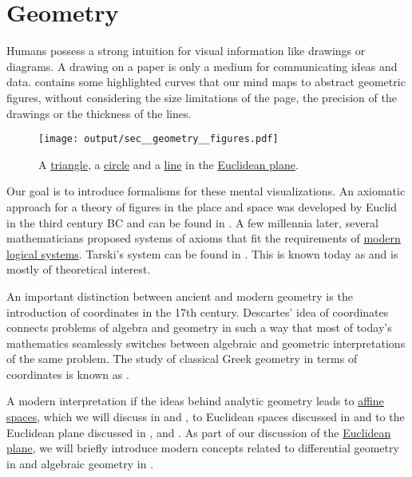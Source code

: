\section{Geometry}\label{sec:geometry}

Humans possess a strong intuition for visual information like drawings or diagrams. A drawing on a paper is only a medium for communicating ideas and data.  contains some highlighted curves that our mind maps to abstract geometric figures, without considering the size limitations of the page, the precision of the drawings or the thickness of the lines.

\begin{figure}[!ht]
  \centering
  \texttt{[image: output/sec\_\_geometry\_\_figures.pdf]}
  \caption{A \hyperref[def:triangle]{triangle}, a \hyperref[def:circle]{circle} and a \hyperref[def:affine_line]{line} in the \hyperref[def:euclidean_space]{Euclidean plane}.}\label{fig:sec:geometry/figures}
\end{figure}

Our goal is to introduce formalisms for these mental visualizations. An axiomatic approach for a theory of figures in the place and space was developed by Euclid in the third century BC and can be found in \cite{Fitzpatrick2008}. A few millennia later, several mathematicians proposed systems of axioms that fit the requirements of \hyperref[sec:mathematical_logic]{modern logical systems}. Tarski's system can be found in \cite{Tarski1959}. This is known today as  and is mostly of theoretical interest.

An important distinction between ancient and modern geometry is the introduction of coordinates in the 17th century. Descartes' idea of coordinates connects problems of algebra and geometry in such a way that most of today's mathematics seamlessly switches between algebraic and geometric interpretations of the same problem. The study of classical Greek geometry in terms of coordinates is known as .

A modern interpretation if the ideas behind analytic geometry leads to \hyperref[def:affine_spaces]{affine spaces}, which we will discuss in  and , to Euclidean spaces discussed in  and to the Euclidean plane discussed in ,  and . As part of our discussion of the \hyperref[def:euclidean_plane]{Euclidean plane}, we will briefly introduce modern concepts related to differential geometry in  and algebraic geometry in .
